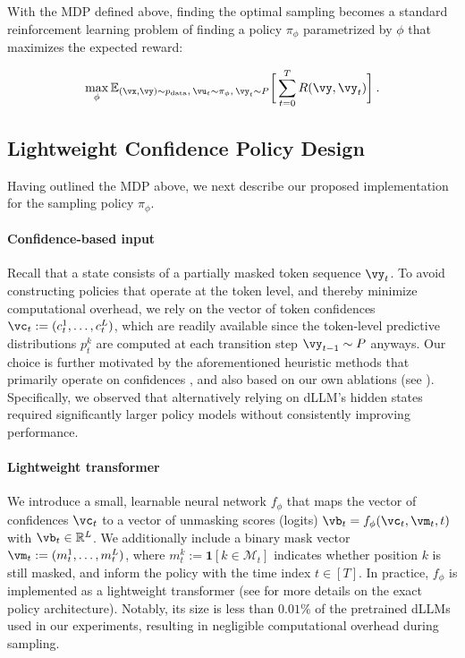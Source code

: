 With the MDP defined above, finding the optimal sampling becomes a standard reinforcement learning problem of finding a policy $\pi_\phi$ parametrized by $\phi$ that maximizes the expected reward:

\begin{align*}
    \max_{\phi} \mathbb{E}_{(\vx, \vy) \sim p_{\text{data}}, \: \vu_t \sim \pi_{\phi}, \: \vy_t \sim P} \bigg[ \sum_{t=0}^T R(\vy,  \vy_t)\bigg] \: .
\end{align*}


    
    
    
    



\subsection{Lightweight Confidence Policy Design}
\label{sec:methods_policy}
Having outlined the MDP above, we next describe our proposed implementation for the sampling policy $\pi_{\phi}$.

\paragraph{Confidence-based input} Recall that a state consists of a partially masked token sequence $\vy_t$. To avoid constructing policies that operate at the token level, and thereby minimize computational overhead, we rely on the vector of token confidences $\vc_t := (c_t^1, \ldots, c_t^L)$, which are readily available since the token-level predictive distributions $p_t^k$ are computed at each transition step $\vy_{t-1} \sim P$ anyways. Our choice is further motivated by the aforementioned heuristic methods that primarily operate on confidences \citep{fastdllm2025}, and also based on our own ablations (see ). Specifically, we observed that alternatively relying on dLLM's hidden states required significantly larger policy models without consistently improving performance. %


\paragraph{Lightweight transformer} We introduce a small, learnable neural network $f_{\phi}$ that maps the vector of confidences $\vc_t$ to a vector of unmasking scores (logits) $\vb_t = f_{\phi}(\vc_t, \vm_t, t)$ with $\vb_t \in \mathbb{R}^L$. We additionally include a binary mask vector $\vm_t := (m_t^1, \ldots, m_t^L)$, where $m_t^k := \mathbf{1}[k \in \mathcal{M}_t]$ indicates whether position $k$ is still masked, and inform the policy with the time index $t \in [T]$.  In practice, $f_{\phi}$ is implemented as a lightweight transformer (see  for more details on the exact policy architecture). Notably, its size is less than $0.01\%$ of the pretrained dLLMs used in our experiments, resulting in negligible computational overhead during sampling.


